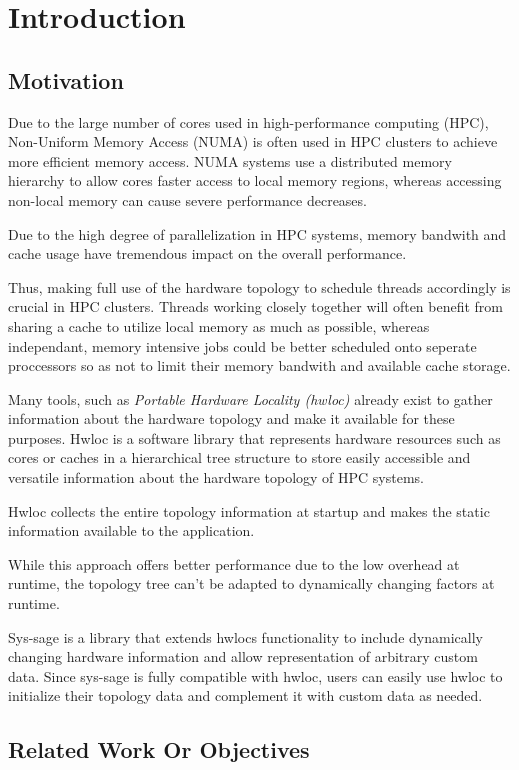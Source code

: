 \chapter{Introduction}\label{chapter:introduction}
\section{Motivation}

Due to the large number of cores used in high-performance computing (HPC), Non-Uniform Memory Access (NUMA) is often used in HPC clusters to achieve more efficient memory access.
NUMA systems use a distributed memory hierarchy to allow cores faster access to local memory regions, whereas accessing non-local memory can cause severe performance decreases. \cite{nuioa_intro}

Due to the high degree of parallelization in HPC systems, memory bandwith and cache usage have tremendous impact on the overall performance. \cite{openmp_intro}

Thus, making full use of the hardware topology to schedule threads accordingly is crucial in HPC clusters.
Threads working closely together will often benefit from sharing a cache to utilize local memory as much as possible,
whereas independant, memory intensive jobs could be better scheduled onto seperate proccessors so as not to limit their memory bandwith and available cache storage. \cite{hwloc_paper}

Many tools, such as \emph{Portable Hardware Locality (hwloc)} \cite{hwloc} already exist to gather information about the hardware topology and make it available for these purposes.
Hwloc is a software library that represents hardware resources such as cores or caches in a hierarchical tree structure
to store easily accessible and versatile information about the hardware topology of HPC systems. \cite{hwloc_paper}

Hwloc collects the entire topology information at startup and makes the static information available to the application. \cite{hwloc_paper}

While this approach offers better performance due to the low overhead at runtime, the topology tree can't be adapted to dynamically changing factors at runtime.

Sys-sage \cite{sys-sage} is a library that extends hwlocs functionality to include dynamically changing hardware information and allow representation of arbitrary custom data.
Since sys-sage is fully compatible with hwloc, users can easily use hwloc to initialize their topology data and complement it with custom data as needed.

\section{Related Work Or Objectives}
